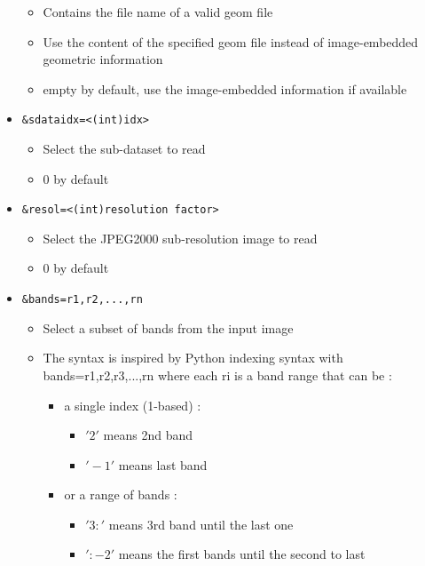 \begin{itemize}
  \begin{itemize}
  \item Contains the file name of a valid geom file
  \item Use the content of the specified geom file instead of image-embedded
    geometric information
  \item empty by default, use the image-embedded information if available
  \end{itemize}  
\item \begin{verbatim}&sdataidx=<(int)idx>\end{verbatim}
  \begin{itemize}
  \item Select the sub-dataset to read
  \item 0 by default
  \end{itemize}
\item \begin{verbatim}&resol=<(int)resolution factor>\end{verbatim}
  \begin{itemize}
  \item Select the JPEG2000 sub-resolution image to read
  \item 0 by default
  \end{itemize}
\item \begin{verbatim}&bands=r1,r2,...,rn\end{verbatim}
\begin{itemize}
    \item Select a subset of bands from the input image
    \item The syntax is inspired by Python indexing syntax with
      bands=r1,r2,r3,...,rn  where each ri is a band range that can be :
      \begin{itemize}
      \item a single index (1-based) :
        \begin{itemize}
          \item $'2'$ means 2nd band
          \item $'-1'$ means last band
          \end{itemize}
        \item or a range of bands :
          \begin{itemize}
            \item $'3:'$ means 3rd band until the last one
            \item $':-2'$ means the first bands until the second to last

\end{itemize}
\end{itemize}
\end{itemize}
\end{itemize}
